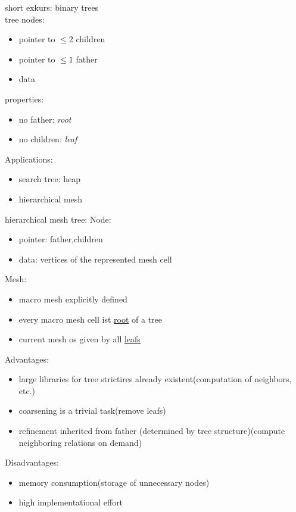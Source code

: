 short exkurs: binary trees\\
tree nodes:
\begin{itemize}
	\item pointer to $\leq 2$ children
	\item pointer to $\leq 1$ father
	\item data
	
\end{itemize}
properties:
\begin{itemize}
	\item no father: \textit{root}
	\item no children: \textit{leaf}
\end{itemize}

Applications:
\begin{itemize}
	\item search tree: heap
	\item hierarchical mesh
\end{itemize}

hierarchical mesh tree:
Node:
\begin{itemize}
	\item pointer: father,children
	\item data: vertices of the represented mesh cell
\end{itemize}

Mesh:
\begin{itemize}
	\item macro mesh explicitly defined
	\item every macro mesh cell ist \underline{root} of a tree
	\item current mesh os given by all \underline{leafs}
\end{itemize}

Advantages:
\begin{itemize}
	\item large libraries for tree strictires already existent(computation of neighbors, etc.)
	\item coarsening is a trivial task(remove leafs)
	\item refinement inherited from father (determined by tree structure)(compute neighboring relations \glqq on demand\grqq)
\end{itemize}

Disadvantages:
\begin{itemize}
	\item memory consumption(storage of unnecessary nodes)
	\item high implementational effort
\end{itemize}

